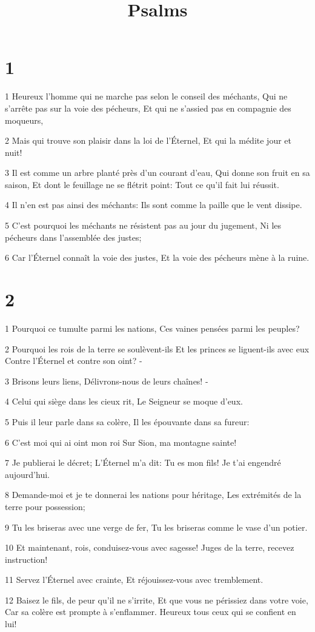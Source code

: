 

\title{Psalms}


\chapter{1}

\par 1 Heureux l'homme qui ne marche pas selon le conseil des méchants, Qui ne s'arrête pas sur la voie des pécheurs, Et qui ne s'assied pas en compagnie des moqueurs,
\par 2 Mais qui trouve son plaisir dans la loi de l'Éternel, Et qui la médite jour et nuit!
\par 3 Il est comme un arbre planté près d'un courant d'eau, Qui donne son fruit en sa saison, Et dont le feuillage ne se flétrit point: Tout ce qu'il fait lui réussit.
\par 4 Il n'en est pas ainsi des méchants: Ils sont comme la paille que le vent dissipe.
\par 5 C'est pourquoi les méchants ne résistent pas au jour du jugement, Ni les pécheurs dans l'assemblée des justes;
\par 6 Car l'Éternel connaît la voie des justes, Et la voie des pécheurs mène à la ruine.

\chapter{2}

\par 1 Pourquoi ce tumulte parmi les nations, Ces vaines pensées parmi les peuples?
\par 2 Pourquoi les rois de la terre se soulèvent-ils Et les princes se liguent-ils avec eux Contre l'Éternel et contre son oint? -
\par 3 Brisons leurs liens, Délivrons-nous de leurs chaînes! -
\par 4 Celui qui siège dans les cieux rit, Le Seigneur se moque d'eux.
\par 5 Puis il leur parle dans sa colère, Il les épouvante dans sa fureur:
\par 6 C'est moi qui ai oint mon roi Sur Sion, ma montagne sainte!
\par 7 Je publierai le décret; L'Éternel m'a dit: Tu es mon fils! Je t'ai engendré aujourd'hui.
\par 8 Demande-moi et je te donnerai les nations pour héritage, Les extrémités de la terre pour possession;
\par 9 Tu les briseras avec une verge de fer, Tu les briseras comme le vase d'un potier.
\par 10 Et maintenant, rois, conduisez-vous avec sagesse! Juges de la terre, recevez instruction!
\par 11 Servez l'Éternel avec crainte, Et réjouissez-vous avec tremblement.
\par 12 Baisez le fils, de peur qu'il ne s'irrite, Et que vous ne périssiez dans votre voie, Car sa colère est prompte à s'enflammer. Heureux tous ceux qui se confient en lui!

